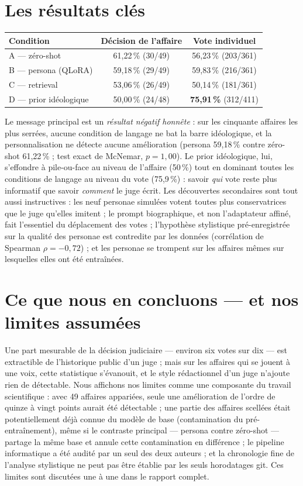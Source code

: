\documentclass[11pt,a4paper]{article}
\begin{document}
\section*{Les résultats clés}

\begin{center}
\begin{tabular}{lcc}
\toprule
Condition & Décision de l'affaire & Vote individuel \\
\midrule
A --- zéro-shot & 61,22\,\% (30/49) & 56,23\,\% (203/361) \\
B --- persona (QLoRA) & 59,18\,\% (29/49) & 59,83\,\% (216/361) \\
C --- retrieval & 53,06\,\% (26/49) & 50,14\,\% (181/361) \\
D --- prior idéologique & 50,00\,\% (24/48) & \textbf{75,91\,\%} (312/411) \\
\bottomrule
\end{tabular}
\end{center}

Le message principal est un \emph{résultat négatif honnête} : sur les
cinquante affaires les plus serrées, aucune condition de langage ne bat la
barre idéologique, et la personnalisation ne détecte aucune amélioration
(persona 59,18\,\% contre zéro-shot 61,22\,\% ; test exact de McNemar,
$p=1{,}00$). Le prior idéologique, lui, s'effondre à pile-ou-face au
niveau de l'affaire (50\,\%) tout en dominant toutes les conditions de
langage au niveau du vote (75,9\,\%) : savoir \emph{qui} vote reste plus
informatif que savoir \emph{comment} le juge écrit. Les découvertes
secondaires sont tout aussi instructives : les neuf personae simulées
votent toutes plus conservatrices que le juge qu'elles imitent ; le prompt
biographique, et non l'adaptateur affiné, fait l'essentiel du
déplacement des votes ; l'hypothèse stylistique pré-enregistrée sur la
qualité des personae est contredite par les données (corrélation de
Spearman $\rho=-0{,}72$) ; et les personae se trompent sur les affaires
mêmes sur lesquelles elles ont été entraînées.

\section*{Ce que nous en concluons --- et nos limites assumées}

Une part mesurable de la décision judiciaire --- environ six votes sur dix
--- est extractible de l'historique public d'un juge ; mais sur les
affaires qui se jouent à une voix, cette statistique s'évanouit, et le
style rédactionnel d'un juge n'ajoute rien de détectable. Nous affichons
nos limites comme une composante du travail scientifique : avec 49 affaires
appariées, seule une amélioration de l'ordre de quinze à vingt points
aurait été détectable ; une partie des affaires scellées était potentiellement déjà
connue du modèle de base (contamination du pré-entraînement), même si le
contraste principal --- persona contre zéro-shot --- partage la même base
et annule cette contamination en différence ; le pipeline informatique a
été audité par un seul des deux auteurs ; et la chronologie fine de
l'analyse stylistique ne peut pas être établie par les seuls horodatages
git. Ces limites sont discutées une à une dans le rapport complet.
\end{document}

